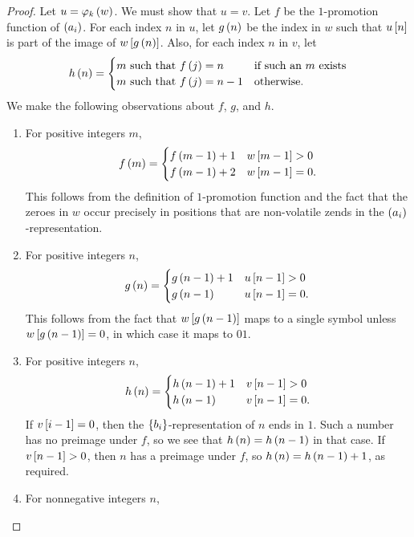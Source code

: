 \documentclass[english,12pt]{article}
\newcommand{\seq}{\p}
\begin{document}
\begin{proof}
Let $u=\varphi_k\left(w\right)$.  We must show that $u=v$.  Let $f$ be the $1$-promotion function of $\seq{a_i}$.  For each index $n$ in $u$, let $g\left(n\right)$ be the index in $w$ such that $u\left[n\right]$ is part of the image of $w\left[g\left(n\right)\right]$.  Also, for each index $n$ in $v$, let
\[
h\left(n\right)=\begin{cases}
m\text{ such that }f\left(j\right)=n & \text{if such an }m\text{ exists}\\
m\text{ such that }f\left(j\right)=n-1 & \text{otherwise}.
\end{cases}
\]
We make the following observations about $f$, $g$, and $h$.
\begin{enumerate}
\item\label{it:tpf} For positive integers $m$,
\[
f\left(m\right)=\begin{cases}
f\left(m-1\right)+1 & w\left[m-1\right]>0\\
f\left(m-1\right)+2 & w\left[m-1\right]=0.
\end{cases}
\]
This follows from the definition of $1$-promotion function and the fact that the zeroes in $w$ occur precisely in positions that are non-volatile zends in the $\seq{a_i}$-representation.
\item\label{it:tpg} For positive integers $n$,
\[
g\left(n\right)=\begin{cases}
g\left(n-1\right)+1 & u\left[n-1\right]>0\\
g\left(n-1\right) & u\left[n-1\right]=0.
\end{cases}
\]
This follows from the fact that $w\left[g\left(n-1\right)\right]$ maps to a single symbol unless $w\left[g\left(n-1\right)\right]=0$, in which case it maps to $01$.
\item\label{it:tph} For positive integers $n$,
\[
h\left(n\right)=\begin{cases}
h\left(n-1\right)+1 & v\left[n-1\right]>0\\
h\left(n-1\right) & v\left[n-1\right]=0.
\end{cases}
\]
If $v\left[i-1\right]=0$, then the $\left\{b_i\right\}$-representation of $n$ ends in $1$.  Such a number has no preimage under $f$, so we see that $h\left(n\right)=h\left(n-1\right)$ in that case.  If $v\left[n-1\right]>0$, then $n$ has a preimage under $f$, so $h\left(n\right)=h\left(n-1\right)+1$, as required.
\item\label{it:tpfg} For nonnegative integers $n$,

\end{enumerate}
\end{proof}
\end{document}
